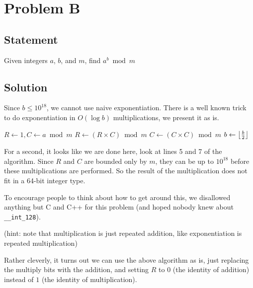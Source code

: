 \section{Problem B}
    \subsection{Statement}
        Given integers $a$, $b$, and $m$, find $a^b \bmod m$

    \subsection{Solution}
        Since $b \leq 10^{18}$, we cannot use naive exponentiation.
        There is a well known trick to do exponentiation in
        $O(\log b)$ multiplications, we present it as is.

        \begin{algorithm}[H]
        \begin{algorithmic}[1]
            \State $R \gets 1, C \gets a \bmod m$
                    \State $R \gets \left(R \times C\right) \bmod m$
                \EndIf
                \State $C \gets \left(C \times C\right) \bmod m$
                \State $b \gets \floor*{\frac b2}$
            \EndWhile
        \EndFunction
        \end{algorithmic}
        \end{algorithm}

        For a second, it looks like we are done here, look at lines
        5 and 7 of the algorithm.
        Since $R$ and $C$ are bounded only by $m$, they can be up to
        $10^{18}$ before these multiplications are performed.
        So the result of the multiplication does not fit in a 64-bit
        integer type.

        To encourage people to think about how to get around this, we
        disallowed anything but C and C++ for this problem (and hoped
        nobody knew about \verb|__int_128|).

        (hint: note that multiplication is just repeated addition, like
        exponentiation is repeated multiplication)

        Rather cleverly, it turns out we can use the above algorithm as is,
        just replacing the multiply bits with the addition, and setting
        $R$ to 0 (the identity of addition) instead of $1$ (the identity
        of multiplication).

